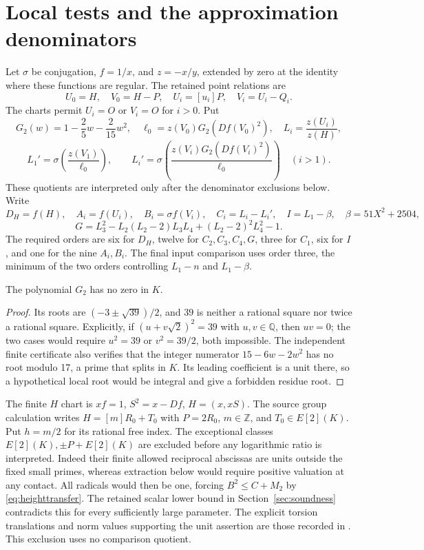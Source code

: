 \documentclass[11pt,a4paper]{article}
\newcommand{\Q}{\mathbb Q}\newcommand{\Z}{\mathbb Z}\newcommand{\HH}{\mathcal H}
\begin{document}
\section{Local tests and the approximation denominators}
Let $\sigma$ be conjugation, $f=1/x$, and $z=-x/y$, extended by zero
at the identity where these functions are regular. The retained
point relations are
\[
 U_0=H,\quad V_0=H-P,\quad U_i=[u_i]P,\quad V_i=U_i-Q_i.
\]
The charts permit $U_i=O$ or $V_i=O$ for $i>0$.
Put
\[
 G_2(w)=1-\frac25w-\frac2{15}w^2,
 \quad \ell_0=z(V_0)G_2(Df(V_0)^2),\quad
 L_i=\frac{z(U_i)}{z(H)},
\]
\[
 L_1'=\sigma\!\left(\frac{z(V_1)}{\ell_0}\right),\qquad
 L_i'=\sigma\!\left(\frac{z(V_i)G_2(Df(V_i)^2)}{\ell_0}\right)\quad(i>1).
\]
These quotients are interpreted only after the denominator exclusions
below. Write
\[
 D_H=f(H),\quad A_i=f(U_i),\quad B_i=\sigma f(V_i),\quad
 C_i=L_i-L_i',\quad I=L_1-\beta,\quad \beta=51X^2+2504,
\]
\[
 G=L_3^2-L_2(L_2-2)L_3L_4+(L_2-2)^2L_4^2-1.
\]
The required orders are six for $D_H$, twelve for $C_2,C_3,C_4,G$,
three for $C_1$, six for $I$, and one for the nine $A_i,B_i$.
The final input comparison uses order three, the minimum of the two
orders controlling $L_1-n$ and $L_1-\beta$.

\begin{lemma}\label{lem:g2}
The polynomial $G_2$ has no zero in $K$.
\end{lemma}
\begin{proof}
Its roots are $(-3\pm\sqrt{39})/2$, and $39$ is neither a rational
square nor twice a rational square. Explicitly, if
$(u+v\sqrt2)^2=39$ with $u,v\in\Q$, then $uv=0$; the two cases
would require $u^2=39$ or $v^2=39/2$, both impossible.
The independent finite certificate also verifies that the integer
numerator $15-6w-2w^2$ has no root modulo 17, a prime that splits in
$K$. Its leading coefficient is a unit there, so a hypothetical local
root would be integral and give a forbidden residue root.
\end{proof}

The finite $H$ chart is $xf=1$, $S^2=x-Df$, $H=(x,xS)$.
The source group calculation writes $H=[m]R_0+T_0$ with $P=2R_0$,
$m\in\Z$, and $T_0\in E[2](K)$. Put $h=m/2$ for its rational
free index. The exceptional classes $E[2](K),\pm P+E[2](K)$ are
excluded before any logarithmic ratio is interpreted. Indeed their
finite allowed reciprocal abscissas are units outside the fixed small
primes, whereas extraction below would require positive valuation
at any contact. All radicals would then be one, forcing
$B^2\le C+M_2$ by \eqref{eq:heighttransfer}. The retained scalar
lower bound in Section~\ref{sec:soundness} contradicts this for every
sufficiently large parameter. The explicit torsion translations and
norm values supporting the unit assertion are those recorded in
\cite[Section 3]{Even}. This exclusion uses no comparison quotient.
\end{document}
